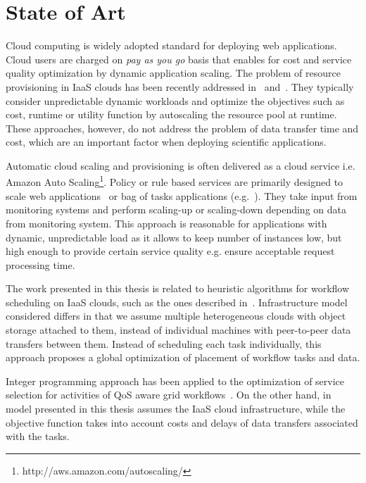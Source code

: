 \chapter{State of Art} \label{chap:state-of-art}  
 
Cloud computing is widely adopted standard for deploying web applications. Cloud users are charged on \emph{pay as you go} basis that enables for cost and service quality optimization by dynamic application scaling. The problem of resource provisioning in IaaS clouds has been recently addressed in~\cite{Chen2011, Kim2011} and~\cite{SqueezingOut}. They typically consider unpredictable dynamic workloads and optimize the objectives such as cost, runtime or utility function by autoscaling the resource pool at runtime. These approaches, however, do not address the problem of data transfer time and cost, which are an important factor when deploying scientific applications.

Automatic cloud scaling and provisioning is often delivered as a cloud service i.e. Amazon Auto Scaling\footnote{http://aws.amazon.com/autoscaling/}. Policy or rule based services are primarily designed to scale web applications~\cite{SqueezingOut} or bag of tasks applications (e.g.~\cite{ElasticSite, Kim2011}). They take input from monitoring systems and perform scaling-up or scaling-down depending on data from monitoring system. This approach is reasonable for applications with dynamic, unpredictable load as it allows to keep number of instances low, but high enough to provide certain service quality e.g. ensure acceptable request processing time.

The work presented in this thesis is related to heuristic algorithms for workflow scheduling on IaaS clouds, such as the ones described in~\cite{Abrishami2013158,Mao11,BarrionuevoFP12,BittencourtM11}. Infrastructure model considered differs in that we assume multiple heterogeneous clouds with object storage attached to them, instead of individual machines with peer-to-peer data transfers between them. Instead of scheduling each task individually, this approach proposes a global optimization of placement of workflow tasks and data.

Integer programming approach has been applied to the optimization of service selection for activities of QoS aware grid workflows~\cite{Brandic08}. On the other hand, in model presented in this thesis assumes the IaaS cloud infrastructure, while the objective function takes into account costs and delays of data transfers associated with the tasks.

